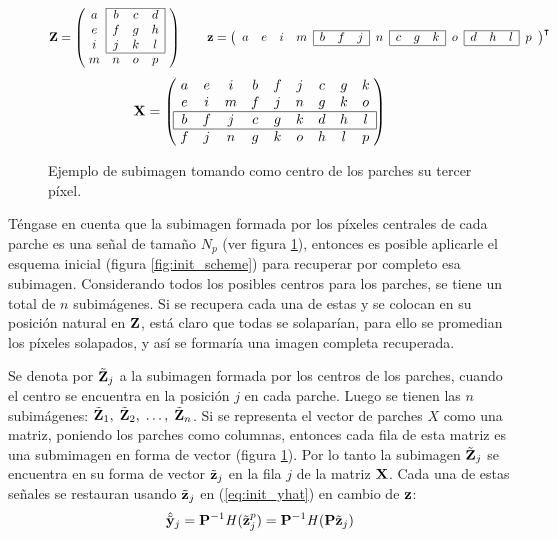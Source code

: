 \begin{figure}[H]
	\[\Z = \left(
		\;\begin{matrix}
		\cline{2-4}
			a & \multicolumn{1}{|c}{b} & c & \multicolumn{1}{c|}{d}\\
			e & \multicolumn{1}{|c}{f} & g & \multicolumn{1}{c|}{h}\\
			i & \multicolumn{1}{|c}{j} & k & \multicolumn{1}{c|}{l}\\\cline{2-4}
			m & n & o & p\\
		\end{matrix}\;\;\;
	\right)
	\qquad\z = \left(
		\begin{array}{cccc|ccc|c|ccc|c|ccc|c}
			\cline{5-7}\cline{9-11}\cline{13-15}
			a & e & i & m & b & f & j & n & c & g & k & o & d & h & l & p\\
			\cline{5-7}\cline{9-11}\cline{13-15}
		\end{array}
	\right)^\intercal
	\]
	\[
	\X = \left(
		\;\begin{matrix}
			a & e & i & b & f & j & c & g & k\\
			e & i & m & f & j & n & g & k & o\\\hline
			\multicolumn{1}{|c}{b} & f & j & c & g & k & d & h & \multicolumn{1}{c|}{l}\\\hline
			f & j & n & g & k & o & h & l & p\\
		\end{matrix}\;
	\right)
	\]
	\caption{Ejemplo de subimagen tomando como centro de los parches su tercer p\'ixel.}
	\label{ex:subimages}
\end{figure}

Téngase en cuenta que la subimagen formada por los p\'ixeles centrales de cada parche es una señal de tamaño $N_p$ (ver figura \ref{ex:subimages}), entonces es posible aplicarle el esquema inicial (figura \ref{fig:init_scheme}) para recuperar por completo esa subimagen. Considerando todos los posibles centros para los parches, se tiene un total de $n$ subim\'agenes. Si se recupera cada una de estas y se colocan en su posición natural en $\mathbf{Z}$, est\'a claro que todas se solapar\'ian, para ello se promedian los p\'ixeles solapados, y así se formar\'ia una imagen completa recuperada. 

Se denota por $\tilde{\mathbf{Z}}_j$ a la subimagen formada por los centros de los parches, cuando el centro se encuentra en la posici\'on $j$ en cada parche. Luego se tienen las $n$ subim\'agenes: $\tilde{\mathbf{Z}}_1,\; \tilde{\mathbf{Z}}_2,\; \dots,\; \tilde{\mathbf{Z}}_n$. Si se representa el vector de parches $X$ como una matriz, poniendo los parches como columnas, entonces cada fila de esta matriz es una submimagen en forma de vector (figura \ref{ex:subimages}). Por lo tanto la subimagen $\tilde{\mathbf{Z}}_j$ se encuentra en su forma de vector $\tilde{\mathbf{z}}_j$ en la fila $j$ de la matriz $\mathbf{X}$. Cada una de estas señales se restauran usando $\tilde{\mathbf{z}}_j$ en (\ref{eq:init_yhat}) en cambio de $\mathbf{z}$:
\begin{equation}
	\hat{\tilde{\mathbf{y}}}_j = \mathbf{P}^{-1}\mathit{H}(\tilde{\mathbf{z}}_j^p) = \mathbf{P}^{-1}\mathit{H}(\mathbf{P}\tilde{\mathbf{z}}_j)
	\label{eq:subimage_yhat}
\end{equation}

